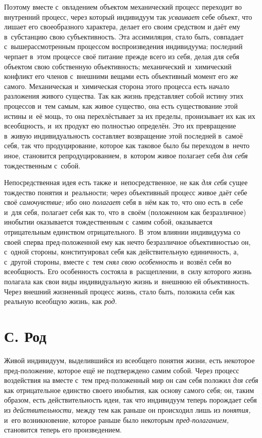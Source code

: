 Поэтому вместе с~овладением объектом механический процесс
переходит во внутренний процесс, через который индивидуум так
{\em усваивает} себе
объект, что лишает его своеобразного характера, делает его своим средством
и даёт ему в~субстанцию свою субъективность. Эта ассимиляция, стало быть,
совпадает с~вышерассмотренным процессом воспроизведения индивидуума;
последний черпает в~этом процессе своё питание прежде всего из себя,
делая для себя объектом свою собственную объективность;
механический и~химический конфликт его членов с~внешними вещами есть
объективный момент его же самого. Механическая и~химическая сторона этого
процесса есть начало разложения живого существа. Так как жизнь представляет
собой истину этих процессов и~тем самым, как живое существо, она есть
существование этой истины и~её мощь, то она перехлёстывает за их пределы,
пронизывает их как их всеобщность, и~их продукт ею полностью определён. Это
их превращение в~живую индивидуальность составляет возвращение этой
последней в~самоё себя, так что продуцирование, которое как таковое было бы
переходом в~нечто иное, становится репродуцированием, в~котором живое
полагает себя {\em для себя}
тождественным с~собой.

Непосредственная идея есть также и~непосредственное, не как
{\em для себя} сущее
тождество понятия и~реальности; через объективный процесс живое даёт себе
своё {\em самочувствие;} ибо оно {\em полагает}
себя в~нём как то, что оно есть в~себе и~для себя, полагает
себя как то, что в~своём (положенном как безразличное) инобытии оказывается
тождественным с~самим собой, оказывается отрицательным единством
отрицательного. В~этом влиянии индивидуума со своей сперва пред-положенной
ему как нечто безразличное объективностью он, с~одной стороны,
конституировал себя как действительную единичность, а, с~другой стороны,
вместе с~тем {\em снял свою
особенность} и~возвёл себя во всеобщность. Его особенность
состояла в~расщеплении, в~силу которого жизнь полагала как свои виды
индивидуальную жизнь и~внешнюю ей объективность. Через внешний жизненный
процесс жизнь, стало быть, положила себя как реальную всеобщую жизнь, как
{\em род}.

\section[С. Род]{С. Род}

Живой индивидуум, выделившийся из всеобщего понятия жизни,
есть некоторое пред-положение, которое ещё не подтверждено самим собой.
Через процесс воздействия на вместе с~тем пред-положенный мир он сам себя
положил {\em для себя}
как отрицательное единство своего инобытия, как основу самого
себя; он, таким образом, есть действительность идеи, так что индивидуум
теперь порождает себя из
{\em действительности,}
между тем как раньше он происходил лишь из
{\em понятия,} и~его
возникновение, которое раньше было некоторым
{\em пред-полаганием,}
становится теперь его произведением.

